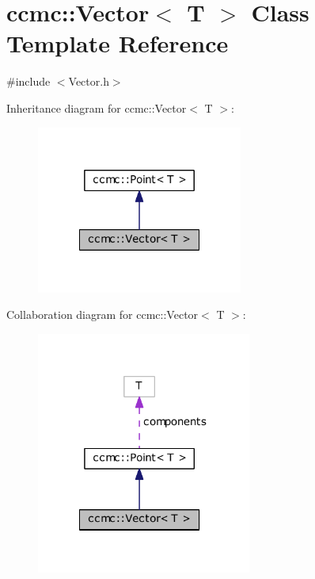 \hypertarget{classccmc_1_1_vector}{\section{ccmc\-:\-:Vector$<$ T $>$ Class Template Reference}
\label{classccmc_1_1_vector}
}


{\ttfamily \#include $<$Vector.\-h$>$}



Inheritance diagram for ccmc\-:\-:Vector$<$ T $>$\-:\nopagebreak
\begin{figure}[H]
\begin{center}
\leavevmode
\includegraphics[width=192pt]{classccmc_1_1_vector__inherit__graph}
\end{center}
\end{figure}


Collaboration diagram for ccmc\-:\-:Vector$<$ T $>$\-:\nopagebreak
\begin{figure}[H]
\begin{center}
\leavevmode
\includegraphics[width=200pt]{classccmc_1_1_vector__coll__graph}
\end{center}
\end{figure}
